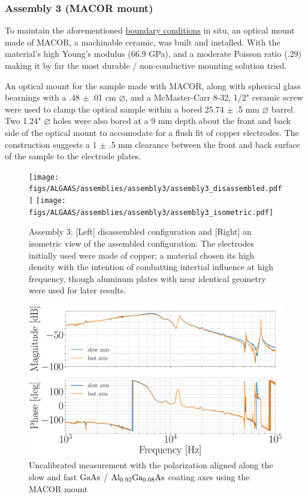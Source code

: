 \subsubsection{Assembly 3 (MACOR mount)}
To maintain the aforementioned \hyperlink{fig:laplacecoords}{boundary conditions} in situ, an optical mount made of MACOR, a machinable ceramic, was built and installed. With the material's high Young's modulus (66.9 GPa), and a moderate Poisson ratio (.29) \cite{macor} making it by far the most durable / non-conductive mounting solution tried.

An optical mount for the sample made with MACOR, along with spherical glass bearnings with a .48 $\pm$ .01 cm $\diameter$, and a McMaster-Carr 8-32, 1/2" ceramic screw were used to clamp the optical sample within a bored 25.74 $\pm$ .5 mm $\diameter$ barrel. Two 1.24" $\diameter$ holes were also bored at a 9 mm depth about the front and back side of the optical mount to accomodate for a flush fit of copper electrodes. The construction suggests a 1 $\pm$ .5 mm clearance between the front and back surface of the sample to the electrode plates.

\begin{figure}[!ht]
    \centering
    \begin{subcaptiongroup}
	    \texttt{[image: figs/ALGAAS/assemblies/assembly3/assembly3\_disassembled.pdf]}
	    \label{subfig:A3disassembled}
	    \texttt{[image: figs/ALGAAS/assemblies/assembly3/assembly3\_isometric.pdf]}
	    \label{subfig:A3isometric}
    \end{subcaptiongroup}
    \caption{Assembly 3: [Left] disassembled configuration and [Right] an isometric view of the assembled configuration. The electrodes initially used were made of copper; a material chosen its high density with the intention of combatting intertial influence at high frequency, though aluminum plates with near identical geometry were used for later results.}
    \label{fig:assembly3}
\end{figure}


\begin{figure}[H]
    \includegraphics[width=\textwidth]{figs/ALGAAS/rawtf_fast_slow.pdf}
    \caption{Uncalibrated measurement with the polarization aligned along the slow and fast $\mathrm{GaAs}$ / $\mathrm{Al_{0.92}Ga_{0.08}As}$ coating axes using the MACOR mount}
    \label{fig:rawtf_fast_slow}
\end{figure}

